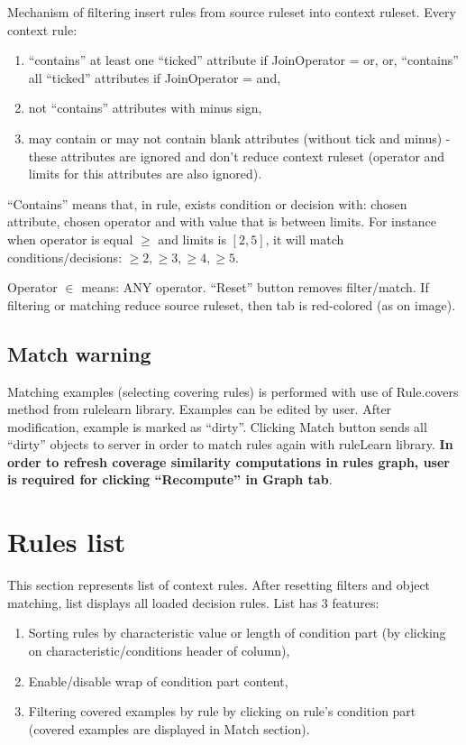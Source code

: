 \documentclass[12pt]{article}
\begin{document}
Mechanism of filtering insert rules from source ruleset into context ruleset. Every context rule:
\begin{enumerate}
    \setlength\itemsep{0em}
    \item ``contains'' at least one ``ticked'' attribute if JoinOperator = or, or, ``contains'' all ``ticked'' attributes if JoinOperator = and,
    \item not ``contains'' attributes with minus sign,
    \item may contain or may not contain blank attributes (without tick and minus) - these attributes are ignored and don't reduce context ruleset (operator and limits for this attributes are also ignored).
\end{enumerate}
``Contains'' means that, in rule, exists condition or decision with: chosen attribute, chosen operator and with value that is between limits. For instance when operator is equal $\ge$ and limits is $[2,5]$, it will match conditions/decisions: $\ge 2, \ge 3, \ge 4, \ge 5$. 

Operator $\in$ means: ANY operator. ``Reset'' button removes filter/match. If filtering or matching reduce source ruleset, then tab is red-colored (as on image).

\subsection{Match warning}\label{match}
Matching examples (selecting covering rules) is performed with use of Rule.covers method from rulelearn library. Examples can be edited by user. After modification, example is marked as ``dirty''. Clicking Match button sends all ``dirty'' objects to server in order to match rules again with ruleLearn library. \textbf{In order to refresh coverage similarity computations in rules graph, user is required for clicking ``Recompute'' in Graph tab}.

\section{Rules list}

This section represents list of context rules. After resetting filters and object matching, list displays all loaded decision rules. List has 3 features:
\begin{enumerate}
    \setlength\itemsep{0em}
    \item Sorting rules by characteristic value or length of condition part (by clicking on characteristic/conditions header of column),
    \item Enable/disable wrap of condition part content,
    \item Filtering covered examples by rule by clicking on rule's condition part (covered examples are displayed in Match section).
\end{enumerate}
\end{document}
